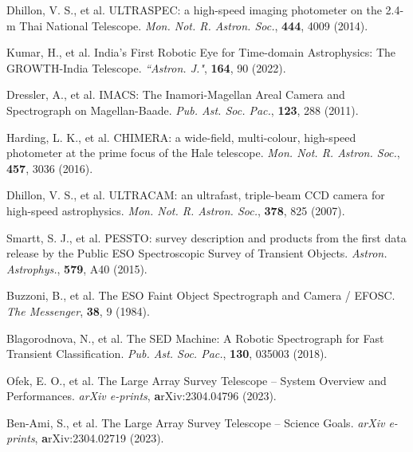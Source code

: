 \documentclass{nature_plusfigure}
\newcommand{\mn}{{Mon. Not. R. Astron. Soc.}}
\newcommand{\mnras}{\mn}
\newcommand{\aj}{{``Astron. J."}}
\newcommand{\aap}{{Astron. Astrophys.}}
\newcommand{\pasp}{{Pub. Ast. Soc. Pac.}}
\begin{document}
\begin{methods}
\begin{thebibliography}{10}

 Dhillon, V. S., et al. ULTRASPEC: a high-speed imaging photometer on the 2.4-m Thai National Telescope. \emph{\mnras}, \textbf{444}, 4009 (2014). 


 Kumar, H., et al. India's First Robotic Eye for Time-domain Astrophysics: The GROWTH-India Telescope. \emph{\aj}, \textbf{164}, 90 (2022). 



 Dressler, A., et al. IMACS: The Inamori-Magellan Areal Camera and Spectrograph on Magellan-Baade. \emph{\pasp}, \textbf{123}, 288 (2011). 


 Harding, L. K., et al. CHIMERA: a wide-field, multi-colour, high-speed photometer at the prime focus of the Hale telescope. \emph{\mnras}, \textbf{457}, 3036 (2016). 

 Dhillon, V. S., et al. ULTRACAM: an ultrafast, triple-beam CCD camera for high-speed astrophysics. \emph{\mnras}, \textbf{378}, 825 (2007). 


 Smartt, S. J., et al. PESSTO: survey description and products from the first data release by the Public ESO Spectroscopic Survey of Transient Objects. \emph{\aap}, \textbf{579}, A40 (2015). 

 Buzzoni, B., et al. The ESO Faint Object Spectrograph and Camera / EFOSC. \emph{The Messenger}, \textbf{38}, 9 (1984). 


 Blagorodnova, N., et al. The SED Machine: A Robotic Spectrograph for Fast Transient Classification. \emph{\pasp}, \textbf{130}, 035003 (2018). 


 Ofek, E. O., et al. The Large Array Survey Telescope -- System Overview and Performances. \emph{arXiv e-prints}, \textbf arXiv:2304.04796 (2023). 

 Ben-Ami, S., et al. The Large Array Survey Telescope -- Science Goals. \emph{arXiv e-prints}, \textbf arXiv:2304.02719 (2023). 


\end{thebibliography}
\end{methods}
\end{document}
